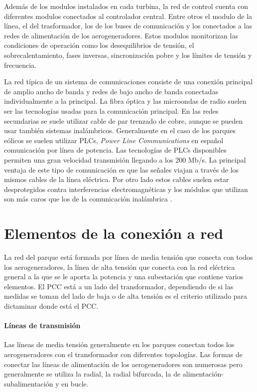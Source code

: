 \documentclass{book}
\begin{document}
		Adem\'as de los modulos instalados en cada turbina, la red de control cuenta con diferentes modulos conectados al controlador central. Entre otros el modulo de la l\'inea, el del trasformador, los de los buses de comunicaci\'on y los conectados a las redes de alimentaci\'on de los aerogeneradores. Estos modulos monitorizan las condiciones de operaci\'on como los desequilibrios de tensi\'on, el sobrecalentamiento, fases inversas, sincronizaci\'on pobre y los l\'imites de tensi\'on y frecuencia\cite{ComunicationControl}.   \par
		La red t\'ipica de un sistema de comunicaciones consiste de una conexi\'on principal de amplio ancho de banda y redes de bajo ancho de banda conectadas individualmente a la principal. La fibra \'optica y las microondas de radio suelen ser las tecnolog\'ias usadas para la comunicaci\'on principal. En las redes secundarias se suele utilizar cable de par trenzado de cobre, aunque se pueden usar tambi\'en sistemas inal\'ambricos. Generalmente en el caso de los parques e\'olicos se suelen utilizar PLCs, \emph{Power Line Communications} en español comunicaci\'on por l\'inea de potencia. Las tecnolog\'ias de PLCs disponibles permiten una gran velocidad transmisi\'on llegando a los 200 Mb/s. La principal ventaja de este tipo de comunicaci\'on es que las señales viajan a trav\'es de los mismos cables de la l\'inea el\'ectrica. Por otro lado estos cables suelen estar desprotegidos contra interferencias electromagn\'eticas y los m\'odulos que utilizan son m\'as caros que los de la comunicaci\'on inal\'ambrica \cite{ComunicationWF}. \par
	
	\section{Elementos de la conexi\'on a red}
	
	La red del parque est\'a formada por l\'inea de media tensi\'on que conecta con todos los aerogeneradores, la l\'inea de alta tensi\'on que conecta con la red el\'ectrica general a la que se le aporta la potencia y una subestaci\'on que contiene varios elementos. El PCC est\'a a un lado del transformador, dependiendo de si las medidas se toman del lado de baja o de alta tensi\'on es el criterio utilizado para dictaminar donde est\'a el PCC. \par
		\paragraph {L\'ineas de transmisi\'on}
Las l\'ineas de media tensi\'on generalmente en los parques conectan todos los aerogeneradores con el transformador con diferentes topolog\'ias. Las formas de conectar las l\'ineas de alimentaci\'on de los aerogeneradores son numerosas pero generalmente se utiliza la radial, la radial bifurcada, la de alimentaci\'on-subalimentaci\'on y en bucle. \par
\end{document}
